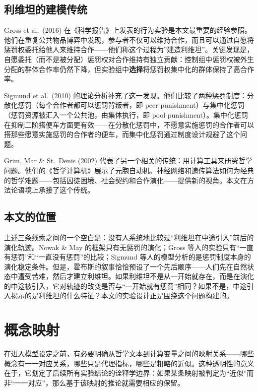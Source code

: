 \documentclass[12pt,a4paper]{ctexart}
\begin{document}
\subsection{利维坦的建模传统}

Gross et al.\ (2016) 在《科学报告》上发表的行为实验是本文最重要的经验参照。他们在重复公共物品博弈中发现，参与者不仅可以维持合作，而且可以通过自愿将惩罚权委托给他人来维持合作——他们称这个过程为”建造利维坦”。关键发现是，自愿委托（而不是被分配）惩罚权对合作维持有独立贡献：控制组中惩罚权被外生分配的群体合作率仍然下降，但实验组中\textbf{选择}将惩罚权集中化的群体保持了高合作率。

Sigmund et al.\ (2010) 的理论分析补充了这一发现。他们比较了两种惩罚制度：分散化惩罚（每个合作者都可以惩罚背叛者，即 peer punishment）与集中化惩罚（惩罚资源被汇入一个公共池，由集体执行，即 pool punishment）。集中化惩罚在抑制二阶搭便车方面更有效——在分散化惩罚中，不愿意实施惩罚的合作者可以搭那些愿意实施惩罚的合作者的便车，而集中化惩罚通过制度设计规避了这个问题。

Grim, Mar \& St.\ Denis (2002) 代表了另一个相关的传统：用计算工具来研究哲学问题。他们的《哲学计算机》展示了元胞自动机、神经网络和遗传算法如何为经典的哲学难题——包括囚徒困境、社会契约和合作演化——提供新的视角。本文在方法论语境上承接了这个传统。

\subsection{本文的位置}

上述三条线索之间的一个空白是：没有人系统地比较过“利维坦在中途引入”前后的演化轨迹。Nowak \& May 的框架只有无惩罚的演化；Gross 等人的实验只有“一直有惩罚”和“一直没有惩罚”的比较；Sigmund 等人的模型分析的是惩罚制度本身的演化稳定条件。但是，霍布斯的叙事恰恰预设了一个先后顺序——人们先在自然状态中遭受苦难，然后才建立利维坦。如果利维坦不是从一开始就存在，而是在演化的中途被引入，它对轨迹的改变是否与“一开始就有惩罚”相同？如果不是，中途引入揭示的是利维坦的什么特征？本文的实验设计正是围绕这个问题构建的。

\section{概念映射}

在进入模型设定之前，有必要明确从哲学文本到计算变量之间的映射关系——哪些概念有一一对应关系，哪些只是代理指标，哪些是粗略的近似。这种透明性的意义在于，它划定了后续所有实验结论的诠释学边界：如果某条映射被判定为“近似”而非“一一对应”，那么基于该映射的推论就需要相应的保留。
\end{document}
